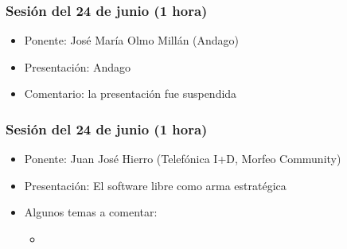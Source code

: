 \documentclass[a4paper,12pt]{article}
\begin{document}
\subsubsection{Sesión del 24 de junio (1 hora)}

\begin{itemize}
\item Ponente: José María Olmo Millán (Andago)
\item Presentación: Andago
\item Comentario: la presentación fue suspendida
\end{itemize}

\subsubsection{Sesión del 24 de junio (1 hora)}

\begin{itemize}
\item Ponente: Juan José Hierro (Telefónica I+D, Morfeo Community)
\item Presentación: El software libre como arma estratégica
\item Algunos temas a comentar: 
  \begin{itemize}
  \item 
  \end{itemize}
\end{itemize}
\end{document}
